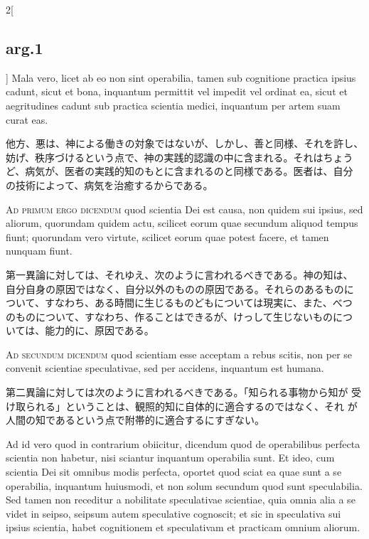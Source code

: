 \documentclass[paper=a4paper,fontsize=10pt,jafontsize=9pt,titlepage]{jlreq}
\begin{document}
\begin{paracol}{2}[\subsection{arg.1}]
Mala vero, licet ab eo non sint operabilia, tamen sub cognitione
practica ipsius cadunt, sicut et bona, inquantum permittit vel impedit
vel ordinat ea, sicut et aegritudines cadunt sub practica scientia
medici, inquantum per artem suam curat eas.

\switchcolumn

他方、悪は、神による働きの対象ではないが、しかし、善と同様、それを許し、
妨げ、秩序づけるという点で、神の実践的認識の中に含まれる。それはちょう
ど、病気が、医者の実践的知のもとに含まれるのと同様である。医者は、自分
の技術によって、病気を治癒するからである。

\switchcolumn*[\subsection{ad.1}]

{\scshape Ad primum ergo dicendum} quod scientia Dei est causa, non
quidem sui ipsius, sed aliorum, quorundam quidem actu, scilicet eorum
quae secundum aliquod tempus fiunt; quorundam vero virtute, scilicet
eorum quae potest facere, et tamen nunquam fiunt.

\switchcolumn

第一異論に対しては、それゆえ、次のように言われるべきである。神の知は、
自分自身の原因ではなく、自分以外のものの原因である。それらのあるものに
ついて、すなわち、ある時間に生じるものどもについては現実に、また、べつ
のものについて、すなわち、作ることはできるが、けっして生じないものにつ
いては、能力的に、原因である。

\switchcolumn*[\subsection{ad.2}]

{\scshape Ad secundum dicendum} quod scientiam esse acceptam a rebus
scitis, non per se convenit scientiae speculativae, sed per accidens,
inquantum est humana.

\switchcolumn

第二異論に対しては次のように言われるべきである。「知られる事物から知が
受け取られる」ということは、観照的知に自体的に適合するのではなく、それ
が人間の知であるという点で附帯的に適合するにすぎない。

\switchcolumn*

\hspace{1em}Ad id vero quod in contrarium obiicitur, dicendum quod de
operabilibus perfecta scientia non habetur, nisi sciantur inquantum
operabilia sunt. Et ideo, cum scientia Dei sit omnibus modis perfecta,
oportet quod sciat ea quae sunt a se operabilia, inquantum huiusmodi,
et non solum secundum quod sunt speculabilia. Sed tamen non receditur
a nobilitate speculativae scientiae, quia omnia alia a se videt in
seipso, seipsum autem speculative cognoscit; et sic in speculativa sui
ipsius scientia, habet cognitionem et speculativam et practicam omnium
aliorum.


\end{paracol}
\end{document}
